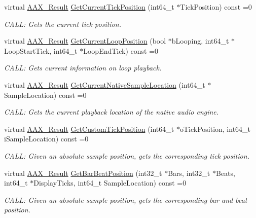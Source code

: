 \begin{DoxyCompactItemize}
virtual \hyperlink{a00149_a4d8f69a697df7f70c3a8e9b8ee130d2f}{A\+A\+X\+\_\+\+Result} \hyperlink{a00116_a2d99dca311ddca98c4d455078edd42d5}{Get\+Current\+Tick\+Position} (int64\+\_\+t $\ast$Tick\+Position) const =0
\begin{DoxyCompactList}\small\item\em C\+A\+L\+L\+: Gets the current tick position. \end{DoxyCompactList}\item 
virtual \hyperlink{a00149_a4d8f69a697df7f70c3a8e9b8ee130d2f}{A\+A\+X\+\_\+\+Result} \hyperlink{a00116_a386bade7d8902130a02c6e6dc8b2123b}{Get\+Current\+Loop\+Position} (bool $\ast$b\+Looping, int64\+\_\+t $\ast$Loop\+Start\+Tick, int64\+\_\+t $\ast$Loop\+End\+Tick) const =0
\begin{DoxyCompactList}\small\item\em C\+A\+L\+L\+: Gets current information on loop playback. \end{DoxyCompactList}\item 
virtual \hyperlink{a00149_a4d8f69a697df7f70c3a8e9b8ee130d2f}{A\+A\+X\+\_\+\+Result} \hyperlink{a00116_a8119233b03774528ffaa519771d792a0}{Get\+Current\+Native\+Sample\+Location} (int64\+\_\+t $\ast$Sample\+Location) const =0
\begin{DoxyCompactList}\small\item\em C\+A\+L\+L\+: Gets the current playback location of the native audio engine. \end{DoxyCompactList}\item 
virtual \hyperlink{a00149_a4d8f69a697df7f70c3a8e9b8ee130d2f}{A\+A\+X\+\_\+\+Result} \hyperlink{a00116_a85aae48051f8596e8145268ecf173dcb}{Get\+Custom\+Tick\+Position} (int64\+\_\+t $\ast$o\+Tick\+Position, int64\+\_\+t i\+Sample\+Location) const =0
\begin{DoxyCompactList}\small\item\em C\+A\+L\+L\+: Given an absolute sample position, gets the corresponding tick position. \end{DoxyCompactList}\item 
virtual \hyperlink{a00149_a4d8f69a697df7f70c3a8e9b8ee130d2f}{A\+A\+X\+\_\+\+Result} \hyperlink{a00116_a51aebee28b9d285863c3527e936dd733}{Get\+Bar\+Beat\+Position} (int32\+\_\+t $\ast$Bars, int32\+\_\+t $\ast$Beats, int64\+\_\+t $\ast$Display\+Ticks, int64\+\_\+t Sample\+Location) const =0
\begin{DoxyCompactList}\small\item\em C\+A\+L\+L\+: Given an absolute sample position, gets the corresponding bar and beat position. \end{DoxyCompactList}\item 

\end{DoxyCompactItemize}
